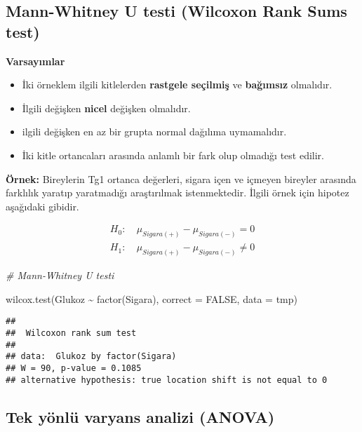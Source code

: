 \documentclass[
]{article}
\newenvironment{Shaded}{\begin{snugshade}}{\end{snugshade}}
\newcommand{\AttributeTok}[1]{\textcolor[rgb]{0.77,0.63,0.00}{#1}}
\newcommand{\CommentTok}[1]{\textcolor[rgb]{0.56,0.35,0.01}{\textit{#1}}}
\newcommand{\ConstantTok}[1]{\textcolor[rgb]{0.00,0.00,0.00}{#1}}
\newcommand{\FunctionTok}[1]{\textcolor[rgb]{0.00,0.00,0.00}{#1}}
\newcommand{\NormalTok}[1]{#1}
\newcommand{\SpecialCharTok}[1]{\textcolor[rgb]{0.00,0.00,0.00}{#1}}
\providecommand{\tightlist}{%
  \setlength{\itemsep}{0pt}\setlength{\parskip}{0pt}}
\begin{document}
\hypertarget{mann-whitney-u-testi-wilcoxon-rank-sums-test}{%
\subsection{Mann-Whitney U testi (Wilcoxon Rank Sums
test)}\label{mann-whitney-u-testi-wilcoxon-rank-sums-test}}

\textbf{Varsayımlar}

\begin{itemize}
\tightlist
\item
  İki örneklem ilgili kitlelerden \textbf{rastgele seçilmiş} ve
  \textbf{bağımsız} olmalıdır.
\item
  İlgili değişken \textbf{nicel} değişken olmalıdır.
\item
  ilgili değişken en az bir grupta normal dağılıma uymamalıdır.
\item
  İki kitle ortancaları arasında anlamlı bir fark olup olmadığı test
  edilir.
\end{itemize}

\textbf{Örnek:} Bireylerin Tg1 ortanca değerleri, sigara içen ve içmeyen
bireyler arasında farklılık yaratıp yaratmadığı araştırılmak
istenmektedir. İlgili örnek için hipotez aşağıdaki gibidir.

\begin{align*}
  H_0:&~ \mu_{Sigara(+)} - \mu_{Sigara(-)} = 0 \\
  H_1:&~ \mu_{Sigara(+)} - \mu_{Sigara(-)} \neq 0
\end{align*}

\begin{Shaded}
\begin{Highlighting}[]
\CommentTok{\# Mann{-}Whitney U testi}

\FunctionTok{wilcox.test}\NormalTok{(Glukoz }\SpecialCharTok{\textasciitilde{}} \FunctionTok{factor}\NormalTok{(Sigara), }\AttributeTok{correct =} \ConstantTok{FALSE}\NormalTok{, }\AttributeTok{data =}\NormalTok{ tmp)}
\end{Highlighting}
\end{Shaded}

\begin{verbatim}
## 
##  Wilcoxon rank sum test
## 
## data:  Glukoz by factor(Sigara)
## W = 90, p-value = 0.1085
## alternative hypothesis: true location shift is not equal to 0
\end{verbatim}

\hypertarget{tek-yuxf6nluxfc-varyans-analizi-anova}{%
\subsection{Tek yönlü varyans analizi
(ANOVA)}\label{tek-yuxf6nluxfc-varyans-analizi-anova}}
\end{document}
